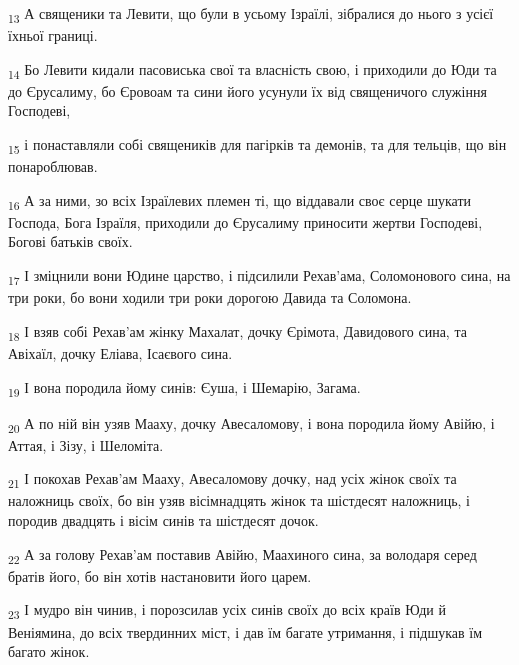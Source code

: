 \begin{tcolorbox}
\textsubscript{13} А священики та Левити, що були в усьому Ізраїлі, зібралися до нього з усієї їхньої границі.
\end{tcolorbox}
\begin{tcolorbox}
\textsubscript{14} Бо Левити кидали пасовиська свої та власність свою, і приходили до Юди та до Єрусалиму, бо Єровоам та сини його усунули їх від священичого служіння Господеві,
\end{tcolorbox}
\begin{tcolorbox}
\textsubscript{15} і понаставляли собі священиків для пагірків та демонів, та для тельців, що він понароблював.
\end{tcolorbox}
\begin{tcolorbox}
\textsubscript{16} А за ними, зо всіх Ізраїлевих племен ті, що віддавали своє серце шукати Господа, Бога Ізраїля, приходили до Єрусалиму приносити жертви Господеві, Богові батьків своїх.
\end{tcolorbox}
\begin{tcolorbox}
\textsubscript{17} І зміцнили вони Юдине царство, і підсилили Рехав'ама, Соломонового сина, на три роки, бо вони ходили три роки дорогою Давида та Соломона.
\end{tcolorbox}
\begin{tcolorbox}
\textsubscript{18} І взяв собі Рехав'ам жінку Махалат, дочку Єрімота, Давидового сина, та Авіхаїл, дочку Еліава, Ісаєвого сина.
\end{tcolorbox}
\begin{tcolorbox}
\textsubscript{19} І вона породила йому синів: Єуша, і Шемарію, Загама.
\end{tcolorbox}
\begin{tcolorbox}
\textsubscript{20} А по ній він узяв Мааху, дочку Авесаломову, і вона породила йому Авійю, і Аттая, і Зізу, і Шеломіта.
\end{tcolorbox}
\begin{tcolorbox}
\textsubscript{21} І покохав Рехав'ам Мааху, Авесаломову дочку, над усіх жінок своїх та наложниць своїх, бо він узяв вісімнадцять жінок та шістдесят наложниць, і породив двадцять і вісім синів та шістдесят дочок.
\end{tcolorbox}
\begin{tcolorbox}
\textsubscript{22} А за голову Рехав'ам поставив Авійю, Маахиного сина, за володаря серед братів його, бо він хотів настановити його царем.
\end{tcolorbox}
\begin{tcolorbox}
\textsubscript{23} І мудро він чинив, і порозсилав усіх синів своїх до всіх країв Юди й Веніямина, до всіх твердинних міст, і дав їм багате утримання, і підшукав їм багато жінок.
\end{tcolorbox}
